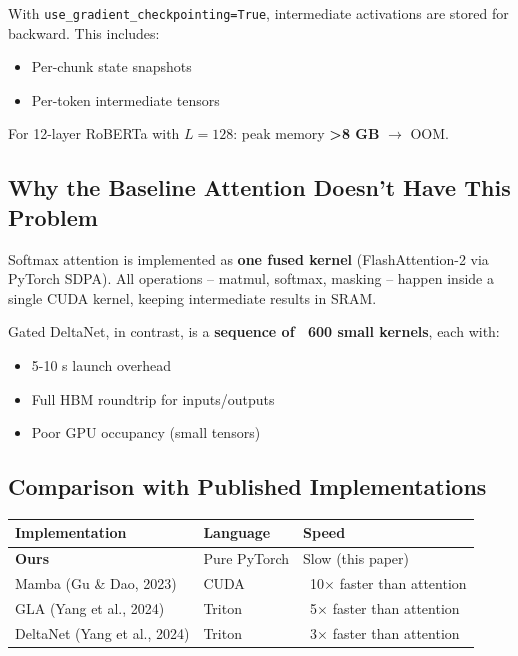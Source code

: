 With \texttt{use\_gradient\_checkpointing=True}, intermediate activations are stored 
for backward. This includes:
\begin{itemize}
\item Per-chunk state snapshots
\item Per-token intermediate tensors

\end{itemize}
For 12-layer RoBERTa with $L=128$: peak memory \textbf{>8 GB} $\to$ OOM.

\subsection{Why the Baseline Attention Doesn't Have This Problem}

Softmax attention is implemented as \textbf{one fused kernel} (FlashAttention-2 
via PyTorch SDPA). All operations -- matmul, softmax, masking -- happen 
inside a single CUDA kernel, keeping intermediate results in SRAM.

Gated DeltaNet, in contrast, is a \textbf{sequence of ~600 small kernels}, each 
with:
\begin{itemize}
\item 5-10  s launch overhead
\item Full HBM roundtrip for inputs/outputs
\item Poor GPU occupancy (small tensors)

\end{itemize}
\subsection{Comparison with Published Implementations}

\begin{table}[H]
\centering
\small
\begin{tabular}{lll}
\toprule
\textbf{Implementation} & \textbf{Language} & \textbf{Speed} \\
\midrule
\textbf{Ours} & Pure PyTorch & Slow (this paper) \\
Mamba (Gu \& Dao, 2023) & CUDA & ~10$\times$ faster than attention \\
GLA (Yang et al., 2024) & Triton & ~5$\times$ faster than attention \\
DeltaNet (Yang et al., 2024) & Triton & ~3$\times$ faster than attention \\
\bottomrule
\end{tabular}
\end{table}


